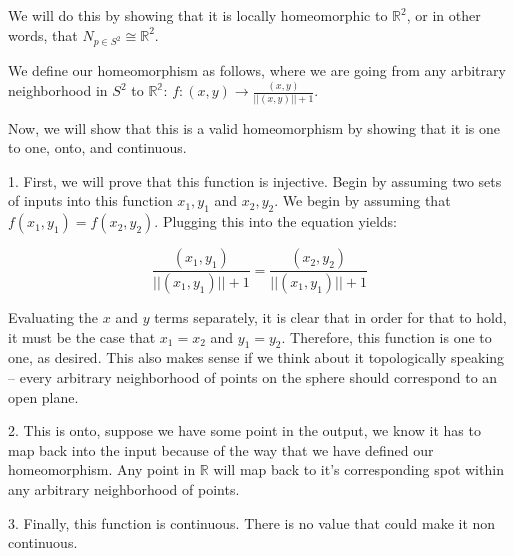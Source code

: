 \documentclass[12pt]{article}
\begin{document}
\begin{enumerate}
We will do this by showing that it is locally homeomorphic to $\mathbb{R}^2$, or in other words, that $N_{p\in S^2} \cong \mathbb{R}^2$.

We define our homeomorphism as follows, where we are going from any arbitrary neighborhood in $S^2$ to $\mathbb{R^2}$: $f: (x,y) \to \frac{(x, y)}{||(x,y)|| + 1}.$

Now, we will show that this is a valid homeomorphism by showing that it is one to one, onto, and continuous.

1. First, we will prove that this function is injective. Begin by assuming two sets of inputs into this function $x_1, y_1$ and $x_2, y_2$. We begin by assuming that $f(x_1, y_1) = f(x_2, y_2)$. Plugging this into the equation yields:

\[\frac{(x_1, y_1)}{||(x_1,y_1)|| + 1} = \frac{(x_2, y_2)}{||(x_1,y_1)|| + 1}\]

Evaluating the $x$ and $y$ terms separately, it is clear that in order for that to hold, it must be the case that $x_1 = x_2$ and $y_1 = y_2$. Therefore, this function is one to one, as desired. This also makes sense if we think about it topologically speaking -- every arbitrary neighborhood of points on the sphere should correspond to an open plane. 

2. This is onto, suppose we have some point in the output, we know it has to map back into the input because of the way that we have defined our homeomorphism. Any point in $\mathbb{R}$ will map back to it's corresponding spot within any arbitrary neighborhood of points.

3. Finally, this function is continuous. There is no value that could make it non continuous.



\end{enumerate}
\end{document}
